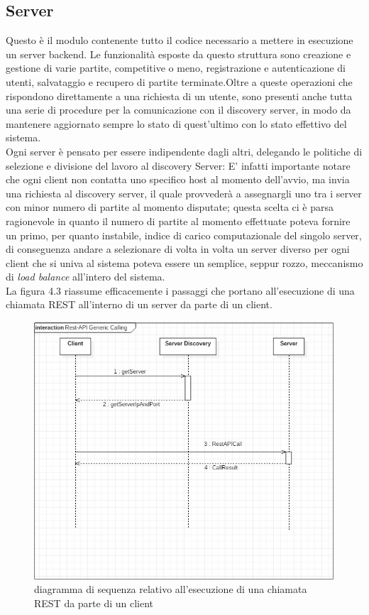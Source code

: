  \subsection {Server}\label{subsec:details:server}
 Questo è il modulo contenente tutto il codice necessario a mettere in esecuzione un server backend. Le funzionalità esposte da questo struttura sono creazione e gestione di varie partite, competitive o meno, registrazione e autenticazione di utenti, salvataggio e recupero di partite terminate.Oltre a queste operazioni che rispondono direttamente a una richiesta di un utente, sono presenti anche tutta una serie di procedure per la comunicazione con il discovery server, in modo da mantenere aggiornato sempre lo stato di quest'ultimo con lo stato effettivo del sistema.\\
 Ogni server è pensato per essere indipendente dagli altri, delegando le politiche di selezione e divisione del lavoro al discovery Server:
 E' infatti importante notare che ogni client non contatta uno specifico host al momento dell'avvio, ma invia una richiesta al discovery server, il quale provvederà a assegnargli uno tra i server con minor numero di partite al momento disputate; questa scelta ci è parsa ragionevole in quanto il numero di partite al momento effettuate poteva fornire un primo, per quanto instabile, indice di carico computazionale del singolo server, di conseguenza andare a selezionare di volta in volta un server diverso per ogni client che si univa al sistema poteva essere un semplice, seppur rozzo, meccanismo di \textit{load balance} all'intero del sistema.\\
 La figura 4.3 riassume efficacemente i passaggi che portano all'esecuzione di una chiamata REST all'interno di un server da parte di un client.\\

 \begin{figure}[H]
   \includegraphics[width=\textwidth,height=\textheight,keepaspectratio]{restAPICall}
    \caption{diagramma di sequenza relativo all'esecuzione di una chiamata REST da parte di un client}
 \end{figure}

